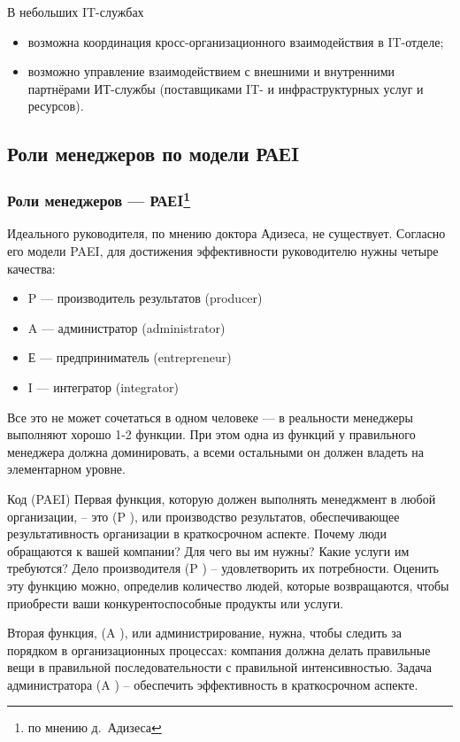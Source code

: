 \documentclass{../industrial-development}
\begin{document}
В небольших IT-службах
\begin{itemize}
\item возможна координация кросс-организационного взаимодействия в IT-отделе;
\item возможно управление взаимодействием с внешними и внутренними партнёрами ИТ-службы (поставщиками IT- и инфраструктурных услуг и ресурсов).
 \end{itemize}
\subsection{Роли менеджеров по модели РАЕI}

\begin{frame} \frametitle{Роли менеджеров — РАЕI\footnote[2]{по мнению д.~Адизеса}}
	Идеального руководителя, по мнению доктора Адизеса, не существует. Согласно его модели PAEI, для достижения эффективности руководителю нужны четыре качества: 
 \begin{itemize}
	 \item \alert{P} — производитель результатов (producer) 
	 \item \alert{A} — администратор (administrator) 
	 \item \alert{Е} — предприниматель (entrepreneur) 
	 \item \alert{I} — интегратор (integrator)
 \end{itemize}
Все это не может сочетаться в одном человеке — в реальности менеджеры выполняют хорошо 1-2 функции. При этом одна из функций у правильного менеджера должна доминировать, а всеми остальными он должен владеть на элементарном уровне.  \\

\end{frame}
\lecturenotes
Код (PAEI) 
Первая функция, которую должен выполнять менеджмент в любой организации, – это (P ), или производство результатов, обеспечивающее результативность организации в краткосрочном аспекте. Почему люди обращаются к вашей компании? Для чего вы им нужны? Какие услуги им требуются? Дело производителя (P ) – удовлетворить их потребности. Оценить эту функцию можно, определив количество людей, которые возвращаются, чтобы приобрести ваши конкурентоспособные продукты или услуги.

Вторая функция, (A ), или администрирование, нужна, чтобы следить за порядком в организационных процессах: компания должна делать правильные вещи в правильной
последовательности с правильной интенсивностью. Задача администратора (A ) – обеспечить
эффективность в краткосрочном аспекте.
\end{document}
